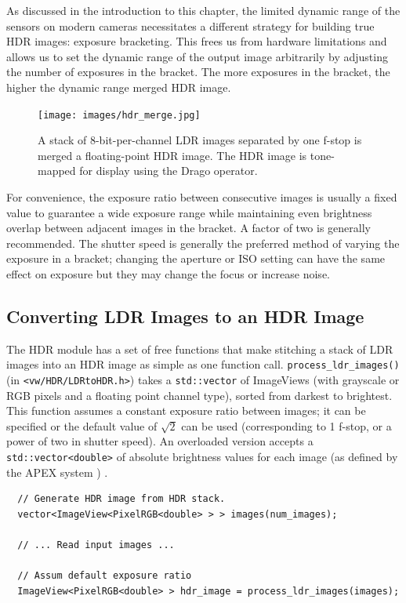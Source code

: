 As discussed in the introduction to this chapter, the limited dynamic
range of the sensors on modern cameras necessitates a different
strategy for building true HDR images: exposure bracketing.  This frees
us from hardware limitations and allows us to set the dynamic range of
the output image arbitrarily by adjusting the number of exposures in
the bracket.  The more exposures in the bracket, the higher the
dynamic range merged HDR image.

\begin{figure}[tbp]
\begin{center}
  \texttt{[image: images/hdr\_merge.jpg]}
 \end{center}
  \caption{A stack of 8-bit-per-channel LDR images separated by one
    f-stop is merged a floating-point HDR image. The HDR image is
    tone-mapped for display using the Drago operator.}
  \label{fig:hdrmerge}
\end{figure}

For convenience, the exposure ratio between consecutive images is
usually a fixed value to guarantee a wide exposure range while
maintaining even brightness overlap between adjacent images in the
bracket. A factor of two is generally recommended.  The shutter speed
is generally the preferred method of varying the exposure in a
bracket; changing the aperture or ISO setting can have the same effect
on exposure but they may change the focus or increase noise.

\subsection{Converting LDR Images to an HDR Image}
The HDR module has a set of free functions that make stitching a stack
of LDR images into an HDR image as simple as one function
call. \verb#process_ldr_images()# (in \verb#<vw/HDR/LDRtoHDR.h>#)
takes a \verb#std::vector# of ImageViews (with grayscale or RGB pixels
and a floating point channel type), sorted from darkest to
brightest. This function assumes a constant exposure ratio between
images; it can be specified or the default value of $\sqrt{2}$ can be
used (corresponding to 1 f-stop, or a power of two in shutter
speed). An overloaded version accepts a \verb#std::vector<double># of
absolute brightness values for each image (as defined by the APEX
system \cite{apex}) .

\begin{verbatim}
  // Generate HDR image from HDR stack. 
  vector<ImageView<PixelRGB<double> > > images(num_images);
  
  // ... Read input images ...

  // Assum default exposure ratio
  ImageView<PixelRGB<double> > hdr_image = process_ldr_images(images);
\end{verbatim}

